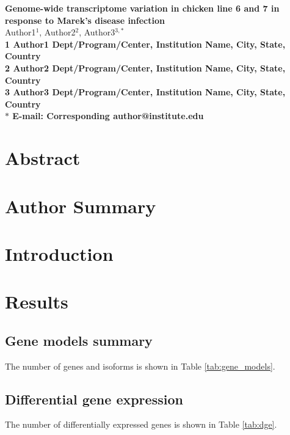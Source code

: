 \documentclass[10pt]{article}
\date{}
\begin{document}
\begin{flushleft}
{\Large
\textbf{Genome-wide transcriptome variation in chicken line 6 and 7 in response to Marek's disease infection}
}
\\
Author1$^{1}$, 
Author2$^{2}$, 
Author3$^{3,\ast}$
\\
\bf{1} Author1 Dept/Program/Center, Institution Name, City, State, Country
\\
\bf{2} Author2 Dept/Program/Center, Institution Name, City, State, Country
\\
\bf{3} Author3 Dept/Program/Center, Institution Name, City, State, Country
\\
$\ast$ E-mail: Corresponding author@institute.edu
\end{flushleft}

\section*{Abstract}

\section*{Author Summary}

\section*{Introduction}

\section*{Results}

\subsection*{Gene models summary}
The number of genes and isoforms is shown in Table \ref{tab:gene_models}.

\subsection*{Differential gene expression}
The number of differentially expressed genes is shown in Table \ref{tab:dge}.
\end{document}
